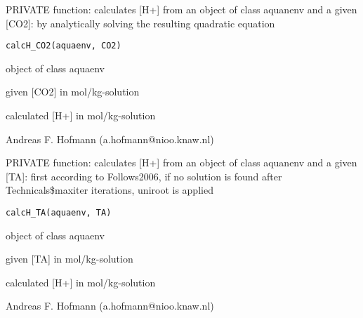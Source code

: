 \documentclass{article}
\begin{document}
\begin{Description}\relax
PRIVATE function: calculates [H+]  from an object of class aquanenv and a given [CO2]: by analytically solving the resulting quadratic equation
\end{Description}
\begin{Usage}
\begin{verbatim}calcH_CO2(aquaenv, CO2)\end{verbatim}
\end{Usage}
\begin{Arguments}
\begin{ldescription}
\item[\code{aquaenv }] object of class aquaenv
\item[\code{CO2 }] given [CO2] in mol/kg-solution
\end{ldescription}
\end{Arguments}
\begin{Value}
calculated [H+] in mol/kg-solution
\end{Value}
\begin{Author}\relax
Andreas F. Hofmann (a.hofmann@nioo.knaw.nl)
\end{Author}

\begin{Description}\relax
PRIVATE function: calculates [H+]  from an object of class aquanenv and a given [TA]: first according to Follows2006, if no solution is found after Technicals\$maxiter iterations, uniroot is applied
\end{Description}
\begin{Usage}
\begin{verbatim}calcH_TA(aquaenv, TA)\end{verbatim}
\end{Usage}
\begin{Arguments}
\begin{ldescription}
\item[\code{aquaenv }] object of class aquaenv
\item[\code{TA }] given [TA] in mol/kg-solution
\end{ldescription}
\end{Arguments}
\begin{Value}
calculated [H+] in mol/kg-solution
\end{Value}
\begin{Author}\relax
Andreas F. Hofmann (a.hofmann@nioo.knaw.nl)
\end{Author}
\end{document}
